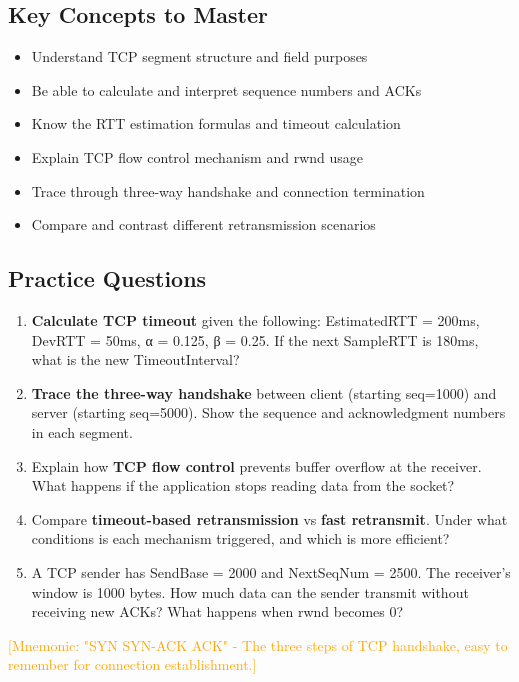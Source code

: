 \documentclass[12pt]{article}
\begin{document}
\subsection{Key Concepts to Master}
\begin{itemize}
    \item Understand TCP segment structure and field purposes
    \item Be able to calculate and interpret sequence numbers and ACKs
    \item Know the RTT estimation formulas and timeout calculation
    \item Explain TCP flow control mechanism and rwnd usage
    \item Trace through three-way handshake and connection termination
    \item Compare and contrast different retransmission scenarios
\end{itemize}

\subsection{Practice Questions}
\begin{enumerate}
    \item \textbf{Calculate TCP timeout} given the following: EstimatedRTT = 200ms, DevRTT = 50ms, α = 0.125, β = 0.25. If the next SampleRTT is 180ms, what is the new TimeoutInterval?

    \item \textbf{Trace the three-way handshake} between client (starting seq=1000) and server (starting seq=5000). Show the sequence and acknowledgment numbers in each segment.

    \item Explain how \textbf{TCP flow control} prevents buffer overflow at the receiver. What happens if the application stops reading data from the socket?

    \item Compare \textbf{timeout-based retransmission} vs \textbf{fast retransmit}. Under what conditions is each mechanism triggered, and which is more efficient?

    \item A TCP sender has SendBase = 2000 and NextSeqNum = 2500. The receiver's window is 1000 bytes. How much data can the sender transmit without receiving new ACKs? What happens when rwnd becomes 0?
\end{enumerate}

\textcolor{orange}{[Mnemonic: "SYN SYN-ACK ACK" - The three steps of TCP handshake, easy to remember for connection establishment.]}
\end{document}
